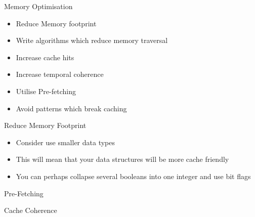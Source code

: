 \begin{frame}{Memory Optimisation}
	\begin{itemize}
		\pause \item Reduce Memory footprint
		\pause \item Write algorithms which reduce memory traversal
		\pause \item Increase cache hits
		\pause \item Increase temporal coherence
		\pause \item Utilise Pre-fetching
		\pause \item Avoid patterns which break caching 
	\end{itemize}
\end{frame}

\begin{frame}{Reduce Memory Footprint}
	\begin{itemize}
		\pause \item Consider use smaller data types
		\pause \item This will mean that your data structures will be more cache friendly
		\pause \item You can perhaps collapse several booleans into one integer and use bit flags 
	\end{itemize}
\end{frame}


\begin{frame}{Pre-Fetching}
\end{frame}

\begin{frame}{Cache Coherence}
\end{frame}